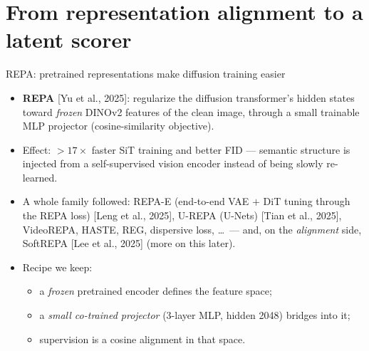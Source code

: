 \documentclass[aspectratio=169,10pt]{beamer}
\newcommand{\litref}[1]{{\scriptsize\color{black!55}[#1]}}
\begin{document}
\section{From representation alignment to a latent scorer}

\begin{frame}{REPA: pretrained representations make diffusion training easier}
  \begin{itemize}
    \item \textbf{REPA} \litref{Yu et al., 2025}: regularize the diffusion
      transformer's hidden states toward \emph{frozen} DINOv2 features of the
      clean image, through a small trainable MLP projector
      (cosine-similarity objective).
    \item Effect: ${>}17\times$ faster SiT training and better FID --- semantic
      structure is injected from a self-supervised vision encoder instead of
      being slowly re-learned.
    \item A whole family followed: REPA-E (end-to-end VAE $+$ DiT tuning
      through the REPA loss) \litref{Leng et al., 2025}, U-REPA (U-Nets)
      \litref{Tian et al., 2025}, VideoREPA, HASTE, REG, dispersive loss,
      \dots\ --- and, on the \emph{alignment} side, SoftREPA
      \litref{Lee et al., 2025} (more on this later).
    \item Recipe we keep:
      \begin{itemize}
        \item a \emph{frozen} pretrained encoder defines the feature space;
        \item a \emph{small co-trained projector} (3-layer MLP, hidden 2048)
          bridges into it;
        \item supervision is a cosine alignment in that space.
      \end{itemize}
  \end{itemize}
\end{frame}
\end{document}
